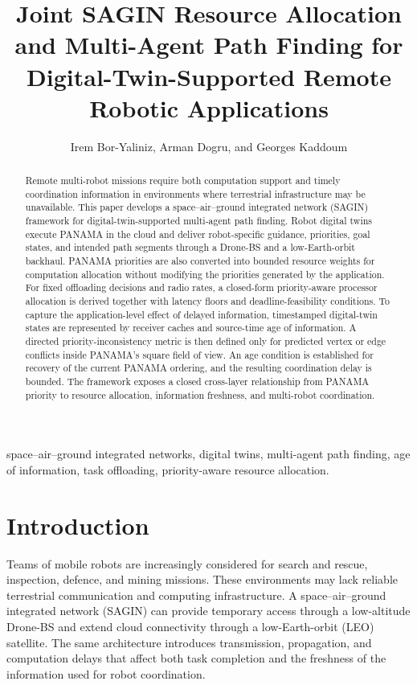 \IfFileExists{IEEEtran.cls}{\documentclass[conference]{IEEEtran}}{\documentclass[10pt,twocolumn]{article}}
\title{Joint SAGIN Resource Allocation and Multi-Agent
Path Finding for Digital-Twin-Supported Remote
Robotic Applications}
\author{Irem Bor-Yaliniz, Arman Dogru, and Georges Kaddoum}
\begin{document}
\maketitle

\begin{abstract}
Remote multi-robot missions require both computation support and timely coordination information in environments where terrestrial infrastructure may be unavailable. This paper develops a space--air--ground integrated network (SAGIN) framework for digital-twin-supported multi-agent path finding. Robot digital twins execute PANAMA in the cloud and deliver robot-specific guidance, priorities, goal states, and intended path segments through a Drone-BS and a low-Earth-orbit backhaul. PANAMA priorities are also converted into bounded resource weights for computation allocation without modifying the priorities generated by the application. For fixed offloading decisions and radio rates, a closed-form priority-aware processor allocation is derived together with latency floors and deadline-feasibility conditions. To capture the application-level effect of delayed information, timestamped digital-twin states are represented by receiver caches and source-time age of information. A directed priority-inconsistency metric is then defined only for predicted vertex or edge conflicts inside PANAMA's square field of view. An age condition is established for recovery of the current PANAMA ordering, and the resulting coordination delay is bounded. The framework exposes a closed cross-layer relationship from PANAMA priority to resource allocation, information freshness, and multi-robot coordination.
\end{abstract}

\begin{IEEEkeywords}
space--air--ground integrated networks, digital twins, multi-agent path finding, age of information, task offloading, priority-aware resource allocation.
\end{IEEEkeywords}

\section{Introduction}
Teams of mobile robots are increasingly considered for search and rescue, inspection, defence, and mining missions. These environments may lack reliable terrestrial communication and computing infrastructure. A space--air--ground integrated network (SAGIN) can provide temporary access through a low-altitude Drone-BS and extend cloud connectivity through a low-Earth-orbit (LEO) satellite. The same architecture introduces transmission, propagation, and computation delays that affect both task completion and the freshness of the information used for robot coordination.
\end{document}
